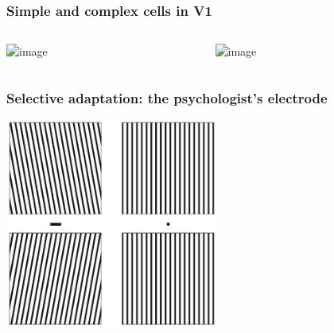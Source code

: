 \documentclass[]{beamer}
\begin{document}
\begin{frame}
 \frametitle{Simple and complex cells in V1}
\begin{overlayarea}{110mm}{70mm}
\begin{columns}[T]
 \begin{column}{55mm}
\begin{center}
\includegraphics<1->[width=50mm]{figs/l3/odd_even_simple_cells.png}
\end{center}
 \end{column}

 \begin{column}{55mm}
\begin{center}
\includegraphics<2->[width=50mm]{figs/l3/complex_cell_response.png}
\end{center}
 \end{column}
\end{columns}

\end{overlayarea}
\end{frame}


\begin{frame}
 \frametitle{Selective adaptation: the psychologist's electrode}
\begin{center}
\includegraphics[width=70mm]{figs/l3/ori_tilt_aftereffect.png}
\end{center}
\end{frame}
\end{document}
